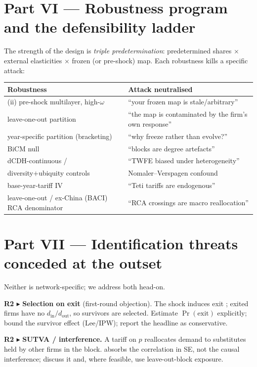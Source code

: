 \documentclass[11pt]{article}
\newcommand{\din}{d_{\mathrm{in}}}
\newcommand{\dout}{d_{\mathrm{out}}}
\newcommand{\R}[1]{\par\smallskip\noindent\textbf{\textcolor{red!55!black}{R2 $\blacktriangleright$}} #1}
\begin{document}
\section{Part VI --- Robustness program and the defensibility ladder}
\label{part:rob}
The strength of the design is \emph{triple predetermination}: predetermined shares
$\times$ external elasticities $\times$ frozen (or pre-shock) map. Each robustness kills
a specific attack:
\begin{center}\small
\begin{tabular}{@{}p{6.3cm}p{6.6cm}@{}}
\toprule
\textbf{Robustness} & \textbf{Attack neutralised} \\
\midrule
(ii) pre-shock multilayer, high-$\omega$ & ``your frozen map is stale/arbitrary'' \\
leave-one-out partition & ``the map is contaminated by the firm's own response'' \\
year-specific partition (bracketing) & ``why freeze rather than evolve?'' \\
BiCM null & ``blocks are degree artefacts'' \\
dCDH-continuous / \citet{callawaygoodmanbacon2024} & ``TWFE biased under heterogeneity'' \\
diversity$+$ubiquity controls & Nomaler--Verspagen confound \\
base-year-tariff IV \citep{amiti2007} & ``Teti tariffs are endogenous'' \\
leave-one-out / ex-China (BACI) RCA denominator & ``RCA crossings are macro reallocation'' \\
\bottomrule
\end{tabular}
\end{center}

\section{Part VII --- Identification threats conceded at the outset}
\label{part:threats}
Neither is network-specific; we address both head-on.
\begin{ref2}
\R{\textbf{Selection on exit} (first-round objection).} The shock induces exit
\citep{crozet2021}; exited firms have no $\din/\dout$, so survivors are selected.
Estimate $\Pr(\text{exit})$ explicitly; bound the survivor effect (Lee/IPW); report the
headline as conservative.
\R{\textbf{SUTVA / interference.}} A tariff on $p$ reallocates demand to substitutes
held by other firms in the block. \citet{adao2019} absorbs the correlation in SE, not
the causal interference; discuss it and, where feasible, use leave-out-block exposure.
\end{ref2}
\end{document}
